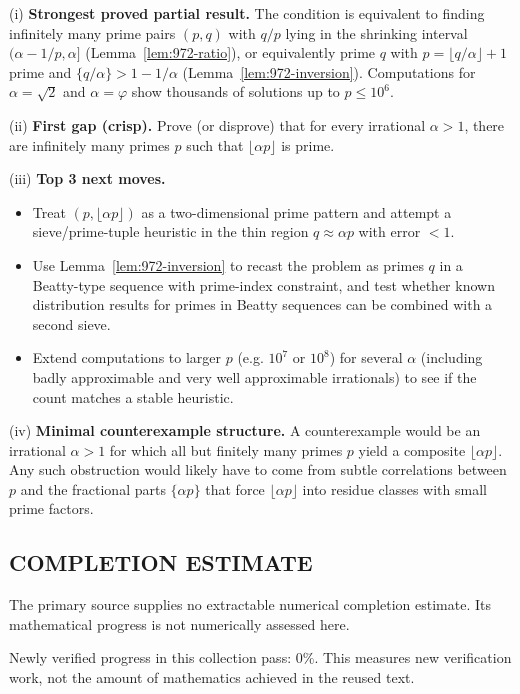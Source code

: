 (i) \textbf{Strongest proved partial result.} The condition is equivalent to finding infinitely many prime pairs $(p,q)$ with $q/p$ lying in the shrinking interval $(\alpha-1/p,\alpha]$ (Lemma~\ref{lem:972-ratio}), or equivalently prime $q$ with $p=\lfloor q/\alpha\rfloor+1$ prime and $\{q/\alpha\}>1-1/\alpha$ (Lemma~\ref{lem:972-inversion}).  Computations for $\alpha=\sqrt2$ and $\alpha=\varphi$ show thousands of solutions up to $p\le 10^6$.

(ii) \textbf{First gap (crisp).} Prove (or disprove) that for every irrational $\alpha>1$, there are infinitely many primes $p$ such that $\lfloor\alpha p\rfloor$ is prime.

(iii) \textbf{Top 3 next moves.}
\begin{itemize}
\item Treat $(p,\lfloor\alpha p\rfloor)$ as a two-dimensional prime pattern and attempt a sieve/prime-tuple heuristic in the thin region $q\approx \alpha p$ with error $<1$.
\item Use Lemma~\ref{lem:972-inversion} to recast the problem as primes $q$ in a Beatty-type sequence with prime-index constraint, and test whether known distribution results for primes in Beatty sequences can be combined with a second sieve.
\item Extend computations to larger $p$ (e.g. $10^7$ or $10^8$) for several $\alpha$ (including badly approximable and very well approximable irrationals) to see if the count matches a stable heuristic.
\end{itemize}

(iv) \textbf{Minimal counterexample structure.} A counterexample would be an irrational $\alpha>1$ for which all but finitely many primes $p$ yield a composite $\lfloor\alpha p\rfloor$.  Any such obstruction would likely have to come from subtle correlations between $p$ and the fractional parts $\{\alpha p\}$ that force $\lfloor\alpha p\rfloor$ into residue classes with small prime factors.




\subsection*{COMPLETION ESTIMATE}
The primary source supplies no extractable numerical completion estimate. Its mathematical progress is not numerically assessed here.

Newly verified progress in this collection pass: $0\%$. This measures new verification work, not the amount of mathematics achieved in the reused text.
